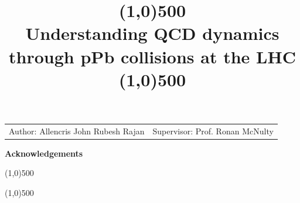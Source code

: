 \documentclass{article}
\begin{document}
\title{ \line(1,0){500} \\ \textbf{Understanding QCD dynamics through pPb collisions at the LHC}  \\ \line(1,0){500}}

\date{\vspace{-5ex}}

\maketitle %

\vspace{1.5cm}

\begin{center}
\begin{tabular}{l l}


\large Author:  Allencris John Rubesh Rajan 

&

\large Supervisor: \large Prof. Ronan McNulty

\end{tabular}
\end{center}

\pagestyle{empty}

\vfill %
\clearpage

\pagebreak

\vspace*{\fill}
\begin{center}
\Large \textbf{Acknowledgements}
\end{center}

\large 
\vspace*{\fill}



\pagebreak

\begin{center}
\line(1,0){500}

\end{center}
\begin{abstract}

\end{abstract}
\begin{center}

\line(1,0){500}
\end{center}

\vspace{0.5cm}

\end{document}
